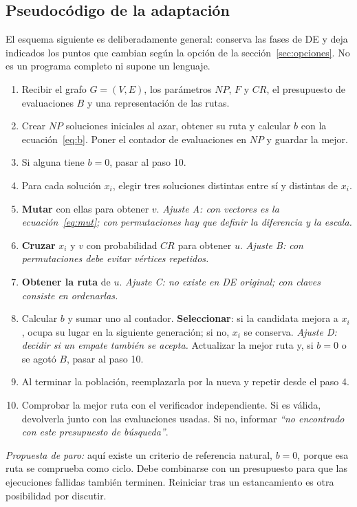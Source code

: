 \documentclass[letterpaper,12pt]{report}
\begin{document}
\subsection{Pseudocódigo de la adaptación}\label{sec:pseudo}
El esquema siguiente es deliberadamente general: conserva las fases de DE y deja indicados los puntos que cambian según la opción de la sección~\ref{sec:opciones}. No es un programa completo ni supone un lenguaje.
\begin{enumerate}[leftmargin=*,label=\arabic*.]
\item Recibir el grafo $G=(V,E)$, los parámetros $NP$, $F$ y $CR$, el presupuesto de evaluaciones $B$ y una representación de las rutas.
\item Crear $NP$ soluciones iniciales al azar, obtener su ruta y calcular $b$ con la ecuación~\eqref{eq:b}. Poner el contador de evaluaciones en $NP$ y guardar la mejor.
\item Si alguna tiene $b=0$, pasar al paso 10.
\item Para cada solución $x_i$, elegir tres soluciones distintas entre sí y distintas de $x_i$.
\item \textbf{Mutar} con ellas para obtener $v$. \emph{Ajuste A: con vectores es la ecuación~\eqref{eq:mut}; con permutaciones hay que definir la diferencia y la escala.}
\item \textbf{Cruzar} $x_i$ y $v$ con probabilidad $CR$ para obtener $u$. \emph{Ajuste B: con permutaciones debe evitar vértices repetidos.}
\item \textbf{Obtener la ruta} de $u$. \emph{Ajuste C: no existe en DE original; con claves consiste en ordenarlas.}
\item Calcular $b$ y sumar uno al contador. \textbf{Seleccionar}: si la candidata mejora a $x_i$, ocupa su lugar en la siguiente generación; si no, $x_i$ se conserva. \emph{Ajuste D: decidir si un empate también se acepta.} Actualizar la mejor ruta y, si $b=0$ o se agotó $B$, pasar al paso 10.
\item Al terminar la población, reemplazarla por la nueva y repetir desde el paso 4.
\item Comprobar la mejor ruta con el verificador independiente. Si es válida, devolverla junto con las evaluaciones usadas. Si no, informar \emph{``no encontrado con este presupuesto de búsqueda''}.
\end{enumerate}

\emph{Propuesta de paro:} aquí existe un criterio de referencia natural, $b=0$, porque esa ruta se comprueba como ciclo. Debe combinarse con un presupuesto para que las ejecuciones fallidas también terminen. Reiniciar tras un estancamiento es otra posibilidad por discutir.
\end{document}
